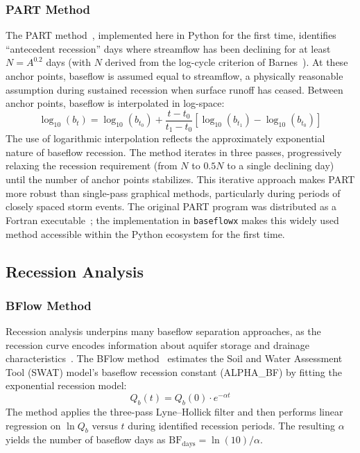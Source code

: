 \documentclass[hydrology,article,submit,pdftex,moreauthors]{Definitions/mdpi}
\begin{document}
\subsubsection{PART Method}

The PART method~\cite{Rutledge1998}, implemented here in Python for the first time, identifies ``antecedent recession'' days where streamflow has been declining for at least $N = A^{0.2}$ days (with $N$ derived from the log-cycle criterion of Barnes~\cite{Barnes1939}). At these anchor points, baseflow is assumed equal to streamflow, a physically reasonable assumption during sustained recession when surface runoff has ceased. Between anchor points, baseflow is interpolated in log-space:
\begin{equation}
\label{eq:part}
\log_{10}(b_t) = \log_{10}(b_{t_0}) + \frac{t - t_0}{t_1 - t_0} \left[ \log_{10}(b_{t_1}) - \log_{10}(b_{t_0}) \right]
\end{equation}
The use of logarithmic interpolation reflects the approximately exponential nature of baseflow recession. The method iterates in three passes, progressively relaxing the recession requirement (from $N$ to $0.5N$ to a single declining day) until the number of anchor points stabilizes. This iterative approach makes PART more robust than single-pass graphical methods, particularly during periods of closely spaced storm events. The original PART program was distributed as a Fortran executable~\cite{Rutledge1998}; the implementation in \texttt{baseflowx} makes this widely used method accessible within the Python ecosystem for the first time.

\subsection{Recession Analysis}
\label{sec:recession}

\subsubsection{BFlow Method}

Recession analysis underpins many baseflow separation approaches, as the recession curve encodes information about aquifer storage and drainage characteristics~\cite{Tallaksen1995,Wittenberg1999}. The BFlow method~\cite{Arnold1999} estimates the Soil and Water Assessment Tool (SWAT) model's baseflow recession constant (ALPHA\_BF) by fitting the exponential recession model:
\begin{equation}
\label{eq:bflow}
Q_b(t) = Q_b(0) \cdot e^{-\alpha t}
\end{equation}
The method applies the three-pass Lyne--Hollick filter and then performs linear regression on $\ln Q_b$ versus $t$ during identified recession periods. The resulting $\alpha$ yields the number of baseflow days as $\mathrm{BF_{days}} = \ln(10)/\alpha$.
\end{document}
